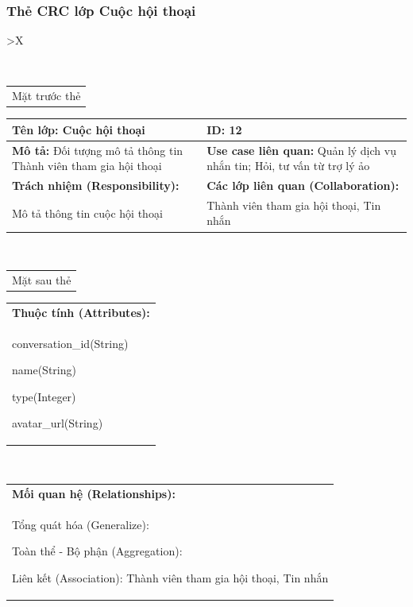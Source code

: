   \subsubsection{Thẻ CRC lớp Cuộc hội thoại}
  \begin{xltabular}{\textwidth}{
    >{\centering\arraybackslash}X 
  }
  \caption{\bfseries \fontsize{12pt}{0pt}\selectfont Thẻ CRC lớp Cuộc hội thoại}
  \\
  \begin{tabularx}{0.9\textwidth}{X}
    Mặt trước thẻ
  \end{tabularx}
  \begin{tabularx}{0.9\textwidth}{|X|X|}
    \hline
    \textbf{Tên lớp:} Cuộc hội thoại & \textbf{ID:} 12 \\
    \hline
    \textbf{Mô tả:} Đối tượng mô tả thông tin Thành viên tham gia hội thoại & \textbf{Use case liên quan:} Quản lý dịch vụ nhắn tin; Hỏi, tư vấn từ trợ lý ảo \\
    \hline
    \textbf{Trách nhiệm (Responsibility):} & \textbf{Các lớp liên quan (Collaboration):} \\
    Mô tả thông tin cuộc hội thoại
    & 
    Thành viên tham gia hội thoại, Tin nhắn
    \\
    \hline
  \end{tabularx}
  \\ 
  \begin{tabularx}{0.9\textwidth}{X}
    Mặt sau thẻ
  \end{tabularx} 
  \begin{tabularx}{0.9\textwidth}{|X|}
    \hline
    \textbf{Thuộc tính (Attributes):} \\
    conversation\_id(String) 
    
    name(String)

    type(Integer)

    avatar\_url(String)
    \\
    \hline
  \end{tabularx}
  \\     
  \begin{tabularx}{0.9\textwidth}{|X|}
    \textbf{Mối quan hệ (Relationships):} \\
    Tổng quát hóa (Generalize):  

    Toàn thể - Bộ phận (Aggregation): 
    
    Liên kết (Association): Thành viên tham gia hội thoại, Tin nhắn 
    \\
    \hline
  \end{tabularx}
  \end{xltabular}

